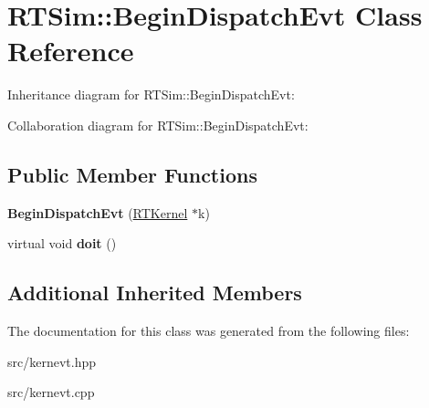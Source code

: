 \hypertarget{classRTSim_1_1BeginDispatchEvt}{}\section{R\+T\+Sim\+:\+:Begin\+Dispatch\+Evt Class Reference}
\label{classRTSim_1_1BeginDispatchEvt}


Inheritance diagram for R\+T\+Sim\+:\+:Begin\+Dispatch\+Evt\+:


Collaboration diagram for R\+T\+Sim\+:\+:Begin\+Dispatch\+Evt\+:
\subsection*{Public Member Functions}
\begin{DoxyCompactItemize}
\item 
{\bfseries Begin\+Dispatch\+Evt} (\hyperlink{classRTSim_1_1RTKernel}{R\+T\+Kernel} $\ast$k)\hypertarget{classRTSim_1_1BeginDispatchEvt_acd3d9fcde99140cac0b9cbb2cb7cdf10}{}\label{classRTSim_1_1BeginDispatchEvt_acd3d9fcde99140cac0b9cbb2cb7cdf10}

\item 
virtual void {\bfseries doit} ()\hypertarget{classRTSim_1_1BeginDispatchEvt_a526a080c917b4483b571fb3dd8c57cfd}{}\label{classRTSim_1_1BeginDispatchEvt_a526a080c917b4483b571fb3dd8c57cfd}

\end{DoxyCompactItemize}
\subsection*{Additional Inherited Members}


The documentation for this class was generated from the following files\+:\begin{DoxyCompactItemize}
\item 
src/kernevt.\+hpp\item 
src/kernevt.\+cpp\end{DoxyCompactItemize}
